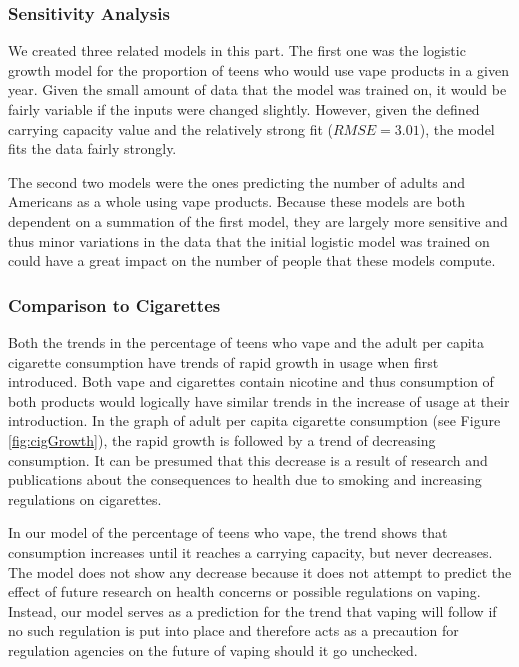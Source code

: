 \documentclass[12pt]{article}
\begin{document}
\subsubsection{Sensitivity Analysis}
We created three related models in this part. The first one was the logistic growth model for the proportion of teens who would use vape products in a given year. Given the small amount of data that the model was trained on, it would be fairly variable if the inputs were changed slightly. However, given the defined carrying capacity value and the relatively strong fit ($RMSE=3.01$), the model fits the data fairly strongly. 

The second two models were the ones predicting the number of adults and Americans as a whole using vape products. Because these models are both dependent on a summation of the first model, they are largely more sensitive and thus minor variations in the data that the initial logistic model was trained on could have a great impact on the number of people that these models compute.

\subsubsection{Comparison to Cigarettes}
Both the trends in the percentage of teens who vape and the adult per capita cigarette consumption have trends of rapid growth in usage when first introduced. Both vape and cigarettes contain nicotine and thus consumption of both products would logically have similar trends in the increase of usage at their introduction. In the graph of adult per capita cigarette consumption (see Figure \ref{fig:cigGrowth}), the rapid growth is followed by a trend of decreasing consumption. It can be presumed that this decrease is a result of research and publications about the consequences to health due to smoking and increasing regulations on cigarettes. 

In our model of the percentage of teens who vape, the trend shows that consumption increases until it reaches a carrying capacity, but never decreases. The model does not show any decrease because it does not attempt to predict the effect of future research on health concerns or possible regulations on vaping. Instead, our model serves as a prediction for the trend that vaping will follow if no such regulation is put into place and therefore acts as a precaution for regulation agencies on the future of vaping should it go unchecked. 
\end{document}
